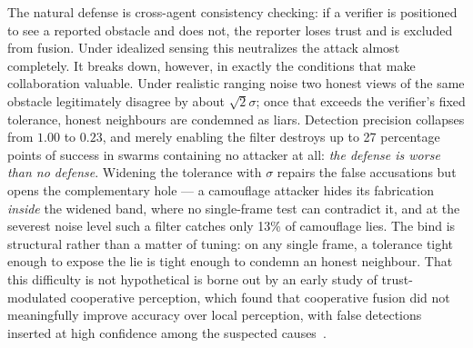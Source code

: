 The natural defense is cross-agent consistency checking: if a verifier is
positioned to see a reported obstacle and does not, the reporter loses
trust and is excluded from fusion. Under idealized sensing this neutralizes
the attack almost completely. It breaks down, however, in exactly the
conditions that make collaboration valuable. Under realistic ranging noise
two honest views of the same obstacle legitimately disagree by about
$\sqrt{2}\sigma$; once that exceeds the verifier's fixed tolerance, honest
neighbours are condemned as liars. Detection precision collapses from
$1.00$ to $0.23$, and merely enabling the filter destroys up to 27
percentage points of success in swarms containing no attacker at all:
\emph{the defense is worse than no defense}. Widening the tolerance with
$\sigma$ repairs the false accusations but opens the complementary hole ---
a camouflage attacker hides its fabrication \emph{inside} the widened band,
where no single-frame test can contradict it, and at the severest noise
level such a filter catches only 13\% of camouflage lies. The bind is
structural rather than a matter of tuning: on any single frame, a tolerance
tight enough to expose the lie is tight enough to condemn an honest
neighbour. That this difficulty is not hypothetical is borne out by an early
study of trust-modulated cooperative perception, which found that
cooperative fusion did not meaningfully improve accuracy over local
perception, with false detections inserted at high confidence among the
suspected causes~\cite{trupercept2020}.

